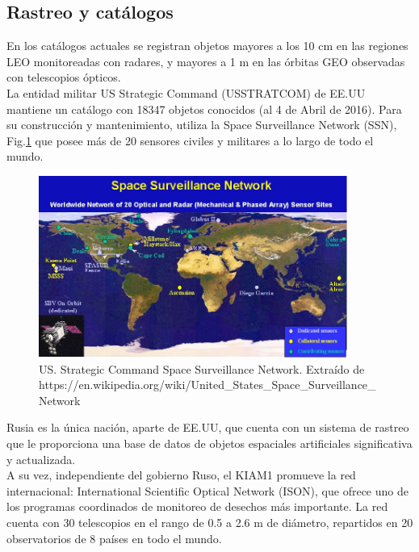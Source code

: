 \subsection*{Rastreo y cat\'alogos}\label{subsec:redes}

En los catálogos actuales se registran objetos mayores a los 10 cm en las regiones LEO monitoreadas con radares, y mayores a 1 m en las órbitas GEO observadas con telescopios ópticos.\\
 
La entidad militar US Strategic Command (USSTRATCOM) de EE.UU mantiene un catálogo con 18347 objetos conocidos (al 4 de Abril de 2016). Para su construcci\'on y mantenimiento, utiliza la Space Surveillance Network (SSN), Fig.\ref{fig:usnet}  que posee m\'as de 20 sensores civiles y militares a lo largo de todo el mundo.\\

\begin{figure}[!h]
  \centering
  \includegraphics[width=0.9\textwidth]{imagenes/SpSNet}
  \caption[USSTRATCOM - SSN]{US. Strategic Command Space Surveillance Network. Extra\'ido de https://en.wikipedia.org/wiki/United\_States\_Space\_Surveillance\_Network}
  \label{fig:usnet}
\end{figure}

Rusia es la única nación, aparte de EE.UU, que cuenta con un sistema de rastreo que le proporciona una base de datos de objetos espaciales artificiales significativa y actualizada.\\
A su vez, independiente del gobierno Ruso, el KIAM1 promueve la red internacional: International Scientific Optical Network (ISON), que ofrece uno de los programas coordinados de monitoreo de desechos más importante.
La red cuenta con 30 telescopios en el rango de 0.5 a 2.6 m de diámetro, repartidos en 20 observatorios de 8 países en todo el mundo.\\

